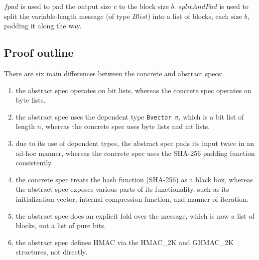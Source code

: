 \documentclass[twocolumn,showpacs,%
  nofootinbib,aps,superscriptaddress,%
  eqsecnum,prd,notitlepage,showkeys,10pt]{revtex4-1}
\begin{document}






$fpad$ is used to pad the output size $c$ to the block size $b$. $splitAndPad$ is used to split the variable-length message (of type $Blist$) into a list of blocks, each size $b$, padding it along the way.

\subsection{Proof outline}

There are six main differences between the concrete and abstract specs:
\begin{enumerate} 
\item the abstract spec operates on bit lists, whereas the concrete spec operates on byte lists.
\item the abstract spec uses the dependent type \verb|Bvector n|, which is a bit list of length $n$, whereas the concrete spec uses byte lists and int lists.
\item due to its use of dependent types, the abstract spec pads its input twice in an ad-hoc manner, whereas the concrete spec uses the SHA-256 padding function consistently.
\item the concrete spec treats the hash function (SHA-256) as a black box, whereas the abstract spec exposes various parts of its functionality, such as its initialization vector, internal compression function, and manner of iteration.
\item the abstract spec does an explicit fold over the message, which is now a list of blocks, not a list of pure bits.
\item the abstract spec defines HMAC via the HMAC\_2K and GHMAC\_2K structures, not directly. 
\end{enumerate}
\end{document}
